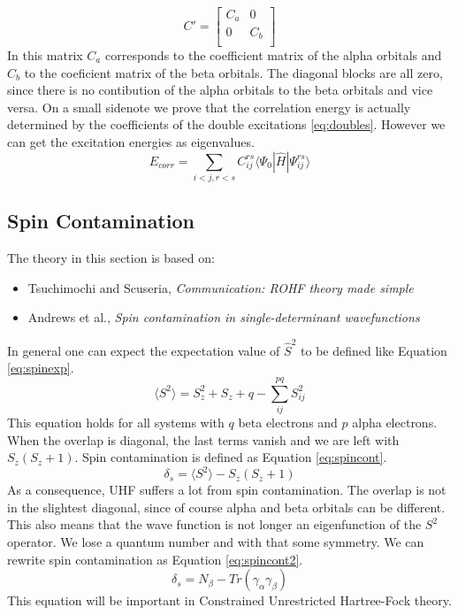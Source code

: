 \begin{equation}\label{eq:coefs}
    C' = \begin{bmatrix}
        C_a & 0 \\
        0 & C_b \\
    \end{bmatrix}
\end{equation} 
In this matrix $C_a$ corresponds to the coefficient matrix of the alpha orbitals and $C_b$ to the coeficient matrix of the beta orbitals. The diagonal blocks are all zero, since there is no contibution of the alpha orbitals to the beta orbitals and vice versa. On a small sidenote we prove that the correlation energy is actually determined by the coefficients of the double excitations \eqref{eq:doubles}. However we can get the excitation energies as eigenvalues.
\begin{equation}\label{eq:doubles}
    E_{corr} = \sum_{i<j, r<s} C_{ij}^{rs}\langle \Psi_{0} |\hat{H}|\Psi_{ij}^{rs}\rangle
\end{equation}

\subsection{Spin Contamination}
The theory in this section is based on:
\begin{itemize}
    \item Tsuchimochi and Scuseria, \textit{Communication: ROHF theory made simple}
    \item Andrews et al., \textit{Spin contamination in single-determinant wavefunctions}
\end{itemize}
In general one can expect the expectation value of $\hat{S}^2$ to be defined like Equation \eqref{eq:spinexp}.
\begin{equation}\label{eq:spinexp}
    \langle S^2 \rangle = S_z^2 + S_z + q - \sum_{ij}^{pq} S_{ij}^2
\end{equation}
This equation holds for all systems with $q$ beta electrons and $p$ alpha electrons. When the overlap is diagonal, the last terms vanish and we are left with $S_z(S_z + 1)$. Spin contamination is defined as Equation \eqref{eq:spincont}.
\begin{equation}\label{eq:spincont}
    \delta_s = \langle S^2 \rangle - S_z(S_z + 1)
\end{equation}
As a consequence, UHF suffers a lot from spin contamination. The overlap is not in the slightest diagonal, since of course alpha and beta orbitals can be different. This also means that the wave function is not longer an eigenfunction of the $S^2$ operator. We lose a quantum number and with that some symmetry. We can rewrite spin contamination as Equation \eqref{eq:spincont2}.
\begin{equation}\label{eq:spincont2}
    \delta_s = N_\beta - Tr(\gamma_\alpha\gamma_\beta)
\end{equation}
This equation will be important in Constrained Unrestricted Hartree-Fock theory.

